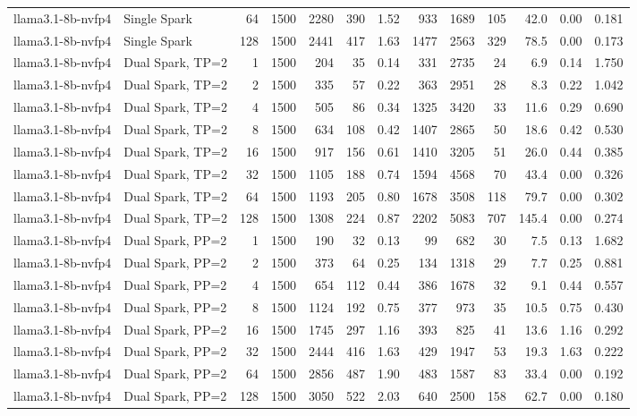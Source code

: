 \begin{tabular}{l l r r r r r r r r r r r}
llama3.1-8b-nvfp4 & Single Spark & 64 & 1500 & 2280 & 390 & 1.52 & 933 & 1689 & 105 & 42.0 & 0.00 & 0.181 \\
llama3.1-8b-nvfp4 & Single Spark & 128 & 1500 & 2441 & 417 & 1.63 & 1477 & 2563 & 329 & 78.5 & 0.00 & 0.173 \\
\addlinespace
llama3.1-8b-nvfp4 & Dual Spark, TP=2 & 1 & 1500 & 204 & 35 & 0.14 & 331 & 2735 & 24 & 6.9 & 0.14 & 1.750 \\
llama3.1-8b-nvfp4 & Dual Spark, TP=2 & 2 & 1500 & 335 & 57 & 0.22 & 363 & 2951 & 28 & 8.3 & 0.22 & 1.042 \\
llama3.1-8b-nvfp4 & Dual Spark, TP=2 & 4 & 1500 & 505 & 86 & 0.34 & 1325 & 3420 & 33 & 11.6 & 0.29 & 0.690 \\
llama3.1-8b-nvfp4 & Dual Spark, TP=2 & 8 & 1500 & 634 & 108 & 0.42 & 1407 & 2865 & 50 & 18.6 & 0.42 & 0.530 \\
llama3.1-8b-nvfp4 & Dual Spark, TP=2 & 16 & 1500 & 917 & 156 & 0.61 & 1410 & 3205 & 51 & 26.0 & 0.44 & 0.385 \\
llama3.1-8b-nvfp4 & Dual Spark, TP=2 & 32 & 1500 & 1105 & 188 & 0.74 & 1594 & 4568 & 70 & 43.4 & 0.00 & 0.326 \\
llama3.1-8b-nvfp4 & Dual Spark, TP=2 & 64 & 1500 & 1193 & 205 & 0.80 & 1678 & 3508 & 118 & 79.7 & 0.00 & 0.302 \\
llama3.1-8b-nvfp4 & Dual Spark, TP=2 & 128 & 1500 & 1308 & 224 & 0.87 & 2202 & 5083 & 707 & 145.4 & 0.00 & 0.274 \\
\addlinespace
llama3.1-8b-nvfp4 & Dual Spark, PP=2 & 1 & 1500 & 190 & 32 & 0.13 & 99 & 682 & 30 & 7.5 & 0.13 & 1.682 \\
llama3.1-8b-nvfp4 & Dual Spark, PP=2 & 2 & 1500 & 373 & 64 & 0.25 & 134 & 1318 & 29 & 7.7 & 0.25 & 0.881 \\
llama3.1-8b-nvfp4 & Dual Spark, PP=2 & 4 & 1500 & 654 & 112 & 0.44 & 386 & 1678 & 32 & 9.1 & 0.44 & 0.557 \\
llama3.1-8b-nvfp4 & Dual Spark, PP=2 & 8 & 1500 & 1124 & 192 & 0.75 & 377 & 973 & 35 & 10.5 & 0.75 & 0.430 \\
llama3.1-8b-nvfp4 & Dual Spark, PP=2 & 16 & 1500 & 1745 & 297 & 1.16 & 393 & 825 & 41 & 13.6 & 1.16 & 0.292 \\
llama3.1-8b-nvfp4 & Dual Spark, PP=2 & 32 & 1500 & 2444 & 416 & 1.63 & 429 & 1947 & 53 & 19.3 & 1.63 & 0.222 \\
llama3.1-8b-nvfp4 & Dual Spark, PP=2 & 64 & 1500 & 2856 & 487 & 1.90 & 483 & 1587 & 83 & 33.4 & 0.00 & 0.192 \\
llama3.1-8b-nvfp4 & Dual Spark, PP=2 & 128 & 1500 & 3050 & 522 & 2.03 & 640 & 2500 & 158 & 62.7 & 0.00 & 0.180 \\
\bottomrule
\end{tabular}
